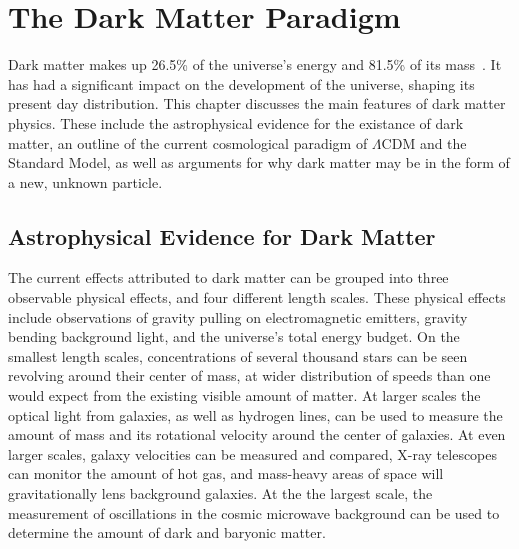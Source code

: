\cleartooddpage[\thispagestyle{empty}]
\chapter{The Dark Matter Paradigm}\label{ch_dm}

  Dark matter makes up 26.5\% of the universe's energy and 81.5\% of its mass~\cite{planck2015}.
  It has had a significant impact on the development of the universe, shaping its present day distribution.
  This chapter discusses the main features of dark matter physics.
  These include the astrophysical evidence for the existance of dark matter, an outline of the current cosmological paradigm of $\Lambda$CDM and the Standard Model, as well as arguments for why dark matter may be in the form of a new, unknown particle.


\section{Astrophysical Evidence for Dark Matter}
  
  The current effects attributed to dark matter can be grouped into three observable physical effects, and four different length scales.
  These physical effects include observations of gravity pulling on electromagnetic emitters, gravity bending background light, and the universe's total energy budget.
  On the smallest length scales, concentrations of several thousand stars can be seen revolving around their center of mass, at wider distribution of speeds than one would expect from the existing visible amount of matter.
  At larger scales the optical light from galaxies, as well as hydrogen lines, can be used to measure the amount of mass and its rotational velocity around the center of galaxies.
  At even larger scales, galaxy velocities can be measured and compared, X-ray telescopes can monitor the amount of hot gas, and mass-heavy areas of space will gravitationally lens background galaxies.
  At the the largest scale, the measurement of oscillations in the cosmic microwave background can be used to determine the amount of dark and baryonic matter.
  
